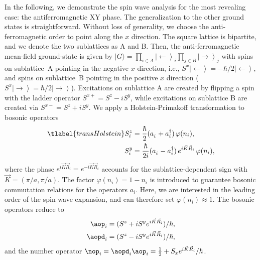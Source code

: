 In the following, we demonstrate the spin wave analysis for the most revealing case: the antiferromagnetic XY phase.
The generalization to the other ground states is straightforward.  Without loss of generality, we choose the anti-ferromagnetic order
to point along the  $x$ direction. The square lattice is bipartite, and we denote the two sublattices as A and B\@. Then, the anti-ferromagnetic
 mean-field ground-state is given by   $|G\rangle = \prod_{i\in A} \left|\leftarrow\right\rangle_{i} \prod_{j\in B} \left|\rightarrow\right\rangle_{j}$
 with spins on sublattice~A pointing in the negative $x$ direction, i.e., $S^x \left|\leftarrow\right\rangle = -\hbar/2 \left|\leftarrow\right\rangle$,
 and spins on sublattice~B pointing in the positive $x$ direction ($S^x \left|\rightarrow\right\rangle = \hbar/2 \left|\rightarrow\right\rangle$).
 Excitations on sublattice A are created by flipping a spin with the ladder operator $S^{x+} = S^z-i S^y$,
 while excitations on sublattice B are created via $S^{x-} = S^z+i S^y$.
 We apply a Holstein-Primakoff transformation to bosonic operators
\begin{align} \tlabel{transHolstein}
    S^z_i &= \frac{\hbar}{2} (a^{\phantom\dag}_i + a^{\dag}_i) \,\varphi(n_i),\\
    S^y_i &= \frac{\hbar}{2i} (a^{\phantom\dag}_i - a^{\dag}_i)\, e^{i {\vec K} {\vec R_i}} \,\varphi(n_i),
\end{align}
where the phase $e^{i {\vec K}{\vec R_i}}=e^{-i {\vec K}{\vec R_i}}$ accounts for the sublattice-dependent sign with ${\vec K} = (\pi/a, \pi/a)$. The factor $\varphi(n_i)=1-n_i$ is introduced to guarantee bosonic commutation relations for the operators $a_i$.  Here, we are interested in the leading order of the spin wave expansion, and can therefore set
 $\varphi(n_i) \approx 1$. The bosonic operators reduce to
%
\begin{align}
    \aop_i &= (S^z +i S^y e^{i {\vec K} {\vec R_i}} )/\hbar,\\
    \aopd_i &= (S^z -i S^y e^{i {\vec K} {\vec R_i}})/\hbar,
\end{align}
%
and the number operator $\nop_i = \aopd_i \aop_i = \frac{1}{2} + S_x e^{i {\vec K}{\vec R_i}}/\hbar$.


